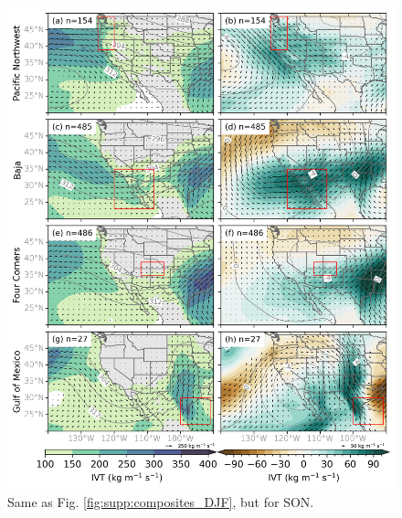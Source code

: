 \documentclass[jgrga]{agutexSI2019}
\begin{document}
\begin{article}
\begin{figure}
\noindent\includegraphics[scale=0.8]{figS10.png}
\caption{Same as Fig. \ref{fig:supp:composites_DJF}, but for SON.}
\label{fig:supp:composites_SON}
\end{figure}
\clearpage


\end{article}
\end{document}
